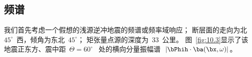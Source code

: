 \subsection{频谱}
%

我们首先考虑一个假想的浅源逆冲地震的频谱或频率域响应；
断层面的走向为北~$45^{\circ}$~西，倾角为东北~$45^{\circ}$；
矩张量点源的深度为~33~公里。
图~\ref{fig:10.3}显示了该地震正东方、震中距~$\Theta=60^\circ$ ~处的横向分量振幅谱~$|\bPhih\cdot\ba(\bx,\omega)|$。
\begin{figure}
\begin{center}
\end{center}
\end{figure}
